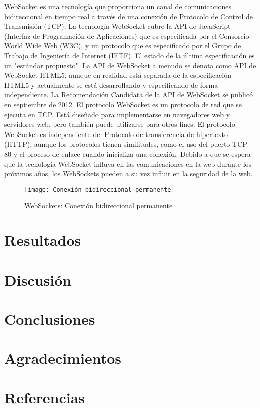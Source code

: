\documentclass[]{article}
\begin{document}
WebSocket es una tecnología que proporciona un canal de comunicaciones bidireccional
en tiempo real a través de una conexión de Protocolo de Control de Transmisión (TCP). La tecnología WebSocket cubre la API de JavaScript (Interfaz de Programación de Aplicaciones) que es especificada por el Consorcio World Wide Web (W3C), y un protocolo que es especificado por el Grupo de Trabajo de Ingeniería de Internet (IETF). El estado de la última especificación es un "estándar propuesto". La API de WebSocket a menudo se denota como API de WebSocket HTML5, aunque en realidad está separada de la especificación HTML5 y actualmente se está desarrollando y especificando de forma independiente. La Recomendación Candidata de la API de WebSocket se publicó en septiembre de 2012. El protocolo WebSocket es un protocolo de red que se ejecuta en TCP. Está diseñado para implementarse en navegadores web y servidores web, pero también puede utilizarse para otros fines. El protocolo WebSocket es independiente del Protocolo de transferencia de hipertexto (HTTP), aunque los protocolos tienen similitudes, como el uso del puerto TCP 80 y el proceso de enlace cuando inicializa una conexión. Debido a que se espera que la tecnología WebSocket influya en las comunicaciones en la
web durante los próximos años, los WebSockets pueden a su vez influir en la seguridad de la web\cite{erkkila2012websocket}. %

\begin{figure}[h]
	\centering
	\texttt{[image: Conexión bidireccional permanente]}%
	\caption{WebSockets: Conexión bidireccional permanente}%
	\label{w:websockets}%
\end{figure}
\section{Resultados}

\section{Discusión}


\section{Conclusiones}
 
\section{Agradecimientos}
\section{Referencias}
\end{document}
